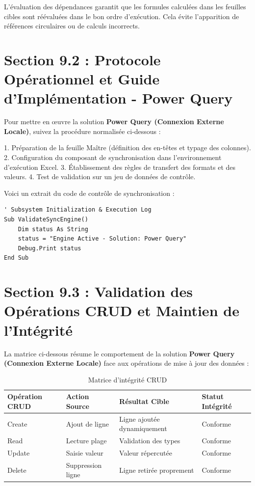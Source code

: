 \documentclass[12pt,a4paper]{report}
\begin{document}
L'évaluation des dépendances garantit que les formules calculées dans les feuilles cibles sont réévaluées dans le bon ordre d'exécution. Cela évite l'apparition de références circulaires ou de calculs incorrects.


\section{Section 9.2 : Protocole Opérationnel et Guide d'Implémentation - Power Query}
Pour mettre en œuvre la solution \textbf{Power Query (Connexion Externe Locale)}, suivez la procédure normalisée ci-dessous :

1. Préparation de la feuille Maître (définition des en-têtes et typage des colonnes).
2. Configuration du composant de synchronisation dans l'environnement d'exécution Excel.
3. Établissement des règles de transfert des formats et des valeurs.
4. Test de validation sur un jeu de données de contrôle.

Voici un extrait du code de contrôle de synchronisation :
\begin{lstlisting}[caption=Code de controle operationnel]
' Subsystem Initialization & Execution Log
Sub ValidateSyncEngine()
    Dim status As String
    status = "Engine Active - Solution: Power Query"
    Debug.Print status
End Sub
\end{lstlisting}


\section{Section 9.3 : Validation des Opérations CRUD et Maintien de l'Intégrité}
La matrice ci-dessous résume le comportement de la solution \textbf{Power Query (Connexion Externe Locale)} face aux opérations de mise à jour des données :

\begin{table}[h]
\centering
\begin{tabular}{@{}llll@{}}
\toprule
\textbf{Opération CRUD} & \textbf{Action Source} & \textbf{Résultat Cible} & \textbf{Statut Intégrité} \\ \midrule
Create & Ajout de ligne & Ligne ajoutée dynamiquement & Conforme \\
Read & Lecture plage & Validation des types & Conforme \\
Update & Saisie valeur & Valeur répercutée & Conforme \\
Delete & Suppression ligne & Ligne retirée proprement & Conforme \\ \bottomrule
\end{tabular}
\caption{Matrice d'intégrité CRUD}
\end{table}
\end{document}

